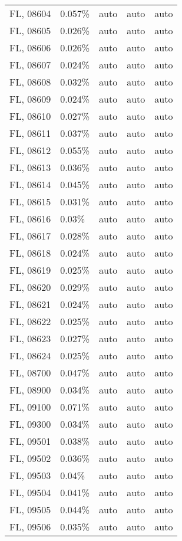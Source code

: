\begin{longtable}[]{@{}lllll@{}}
FL, 08604 & 0.057\% & auto & auto & auto \\
FL, 08605 & 0.026\% & auto & auto & auto \\
FL, 08606 & 0.026\% & auto & auto & auto \\
FL, 08607 & 0.024\% & auto & auto & auto \\
FL, 08608 & 0.032\% & auto & auto & auto \\
FL, 08609 & 0.024\% & auto & auto & auto \\
FL, 08610 & 0.027\% & auto & auto & auto \\
FL, 08611 & 0.037\% & auto & auto & auto \\
FL, 08612 & 0.055\% & auto & auto & auto \\
FL, 08613 & 0.036\% & auto & auto & auto \\
FL, 08614 & 0.045\% & auto & auto & auto \\
FL, 08615 & 0.031\% & auto & auto & auto \\
FL, 08616 & 0.03\% & auto & auto & auto \\
FL, 08617 & 0.028\% & auto & auto & auto \\
FL, 08618 & 0.024\% & auto & auto & auto \\
FL, 08619 & 0.025\% & auto & auto & auto \\
FL, 08620 & 0.029\% & auto & auto & auto \\
FL, 08621 & 0.024\% & auto & auto & auto \\
FL, 08622 & 0.025\% & auto & auto & auto \\
FL, 08623 & 0.027\% & auto & auto & auto \\
FL, 08624 & 0.025\% & auto & auto & auto \\
FL, 08700 & 0.047\% & auto & auto & auto \\
FL, 08900 & 0.034\% & auto & auto & auto \\
FL, 09100 & 0.071\% & auto & auto & auto \\
FL, 09300 & 0.034\% & auto & auto & auto \\
FL, 09501 & 0.038\% & auto & auto & auto \\
FL, 09502 & 0.036\% & auto & auto & auto \\
FL, 09503 & 0.04\% & auto & auto & auto \\
FL, 09504 & 0.041\% & auto & auto & auto \\
FL, 09505 & 0.044\% & auto & auto & auto \\
FL, 09506 & 0.035\% & auto & auto & auto \\

\end{longtable}
